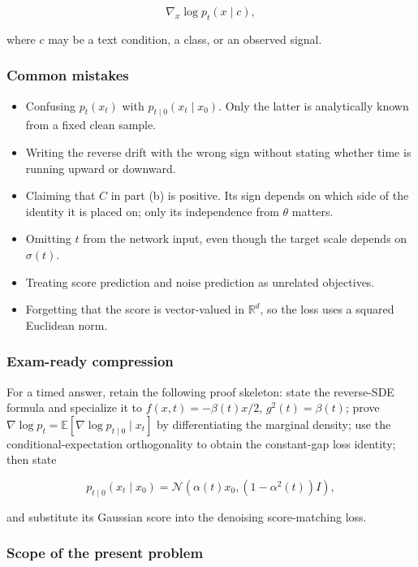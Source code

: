 \documentclass[11pt,a4paper]{article}
\theoremstyle{definition}
\begin{document}
\[
\nabla_x\log p_t(x\mid c),
\]

where $c$ may be a text condition, a class, or an observed signal.

\subsubsection{Common mistakes}

\begin{itemize}
    \item Confusing $p_t(x_t)$ with $p_{t\mid 0}(x_t\mid x_0)$. Only the latter is analytically known from a fixed clean sample.
    \item Writing the reverse drift with the wrong sign without stating whether time is running upward or downward.
    \item Claiming that $C$ in part (b) is positive. Its sign depends on which side of the identity it is placed on; only its independence from $\theta$ matters.
    \item Omitting $t$ from the network input, even though the target scale depends on $\sigma(t)$.
    \item Treating score prediction and noise prediction as unrelated objectives.
    \item Forgetting that the score is vector-valued in $\mathbb{R}^d$, so the loss uses a squared Euclidean norm.
\end{itemize}

\subsubsection{Exam-ready compression}

For a timed answer, retain the following proof skeleton: state the reverse-SDE formula and specialize it to $f(x,t)=-\beta(t)x/2$, $g^2(t)=\beta(t)$; prove $\nabla\log p_t=\mathbb{E}[\nabla\log p_{t\mid 0}\mid x_t]$ by differentiating the marginal density; use the conditional-expectation orthogonality to obtain the constant-gap loss identity; then state

\[
p_{t\mid 0}(x_t\mid x_0)=\mathcal{N}\left(\alpha(t)x_0,\left(1-\alpha^2(t)\right)I\right),
\]

and substitute its Gaussian score into the denoising score-matching loss.

\subsubsection{Scope of the present problem}
\end{document}
